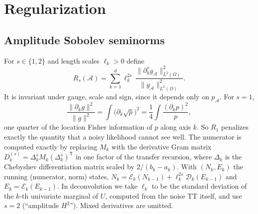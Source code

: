 \documentclass[11pt]{article}
\theoremstyle{definition}
\theoremstyle{remark}
\newcommand{\T}{\mathsf{T}}
\newcommand{\norm}[1]{\lVert #1\rVert}
\begin{document}
\section{Regularization}
\label{sec:reg}

\subsection{Amplitude Sobolev seminorms}
\label{sec:sobolev}
For $s\in\{1,2\}$ and length scales $\ell_k>0$ define
\begin{equation}\label{eq:sobolev}
  R_s(\mathcal A)=\sum_{k=1}^d \ell_k^{2s}\,\frac{\norm{\partial_k^s g_{\mathcal A}}_{L^2(\Omega)}^2}{\norm{g_{\mathcal A}}_{L^2(\Omega)}^2}.
\end{equation}
It is invariant under gauge, scale and sign, since it depends only on $p_{\mathcal A}$. For $s=1$,
\begin{equation}
  \frac{\norm{\partial_k g}^2}{\norm g^2}=\int\bigl(\partial_k\sqrt{p}\bigr)^2=\frac14\int\frac{(\partial_kp)^2}{p},
\end{equation}
one quarter of the location Fisher information of $p$ along axis $k$. So $R_1$ penalizes exactly the quantity that a
noisy likelihood cannot see well. The numerator is computed exactly by replacing $M_k$ with the derivative Gram
matrix $D^{(s)}_k=\Delta_k^sM_k(\Delta_k^s)^\T$ in one factor of the transfer recursion, where $\Delta_k$ is the Chebyshev
differentiation matrix scaled by $2/(b_k-a_k)$. With $(N_k,E_k)$ the running (numerator, norm) states,
$N_k=\mathcal E_k(N_{k-1})+\ell_k^{2s}\mathcal D_k(E_{k-1})$ and $E_k=\mathcal E_k(E_{k-1})$. In deconvolution we take
$\ell_k$ to be the standard deviation of the $k$-th univariate marginal of $U$, computed from the noise TT itself,
and use $s=2$ (``amplitude $H^2$''). Mixed derivatives are omitted.
\end{document}
